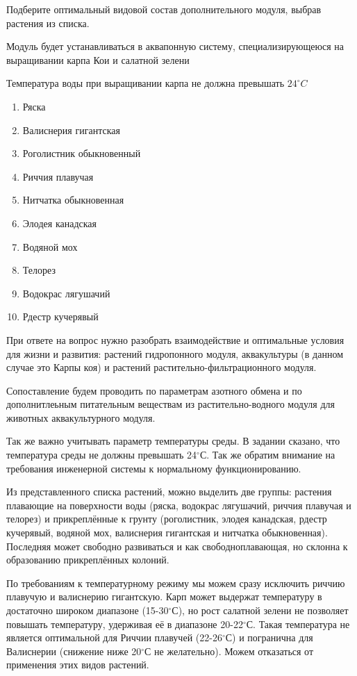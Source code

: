 
Подберите оптимальный видовой состав дополнительного модуля, выбрав растения из списка.

Модуль будет устанавливаться в аквапонную систему, специализирующеюся на выращивании карпа Кои и салатной зелени

Температура воды при выращивании карпа не должна превышать $24^{\circ}C$

\begin{enumerate}
    \item Ряска
    \item Валиснерия гигантская
    \item Роголистник обыкновенный
    \item Риччия плавучая
    \item Нитчатка обыкновенная
    \item Элодея канадская
    \item Водяной мох
    \item Телорез
    \item Водокрас лягушачий
    \item Рдестр кучерявый
\end{enumerate}

\explanationSection

При ответе на вопрос нужно разобрать взаимодействие и оптимальные условия для жизни и развития: 
растений гидропонного модуля, аквакультуры (в данном случае это Карпы коя) и растений растительно-фильтрационного модуля.

Сопоставление будем проводить по параметрам азотного обмена и по дополнитлеьным питательным веществам из растительно-водного 
модуля для животных аквакультурного модуля.

Так же важно учитывать параметр температуры среды. В задании сказано, что температура среды не должны превышать 24$^\circ$С. Так же 
обратим внимание на требования инженерной системы к нормальному функционированию.

Из представленного списка растений, можно выделить две группы: растения плавающие на поверхности воды (ряска, водокрас лягушачий, риччия 
плавучая и телорез) и прикреплённые к грунту (роголистник, элодея канадская, рдестр кучерявый, водяной мох, валиснерия гигантская и 
нитчатка обыкновенная). Последняя может свободно развиваться и как свободноплавающая, но склонна к образованию прикреплённых колоний.

По требованиям к температурному режиму мы можем сразу исключить риччию плавучую и валиснерию гигантскую. Карп может выдержат 
температуру в достаточно широком диапазоне (15-30$^\circ$С), но рост салатной зелени не позволяет повышать температуру, удерживая её в 
диапазоне 20-22$^\circ$С. Такая температура не является оптимальной для Риччии плавучей (22-26$^\circ$С) и погранична для Валиснерии 
(снижение ниже 20$^\circ$С не желательно). Можем отказаться от применения этих видов растений.

